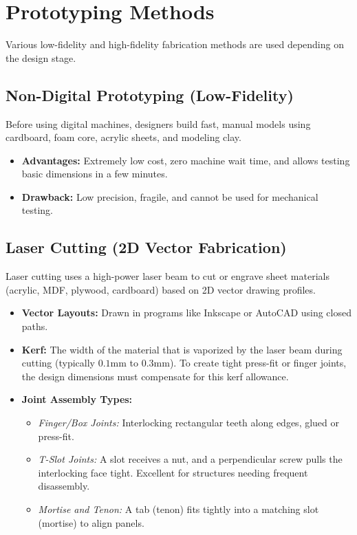 \documentclass[12pt,a4paper]{article}
\begin{document}
\section{Prototyping Methods}

Various low-fidelity and high-fidelity fabrication methods are used depending on the design stage.

\subsection{Non-Digital Prototyping (Low-Fidelity)}
Before using digital machines, designers build fast, manual models using cardboard, foam core, acrylic sheets, and modeling clay.
\begin{itemize}[leftmargin=*, itemsep=2.5pt]
  \item \textbf{Advantages:} Extremely low cost, zero machine wait time, and allows testing basic dimensions in a few minutes.
  \item \textbf{Drawback:} Low precision, fragile, and cannot be used for mechanical testing.
\end{itemize}

\subsection{Laser Cutting (2D Vector Fabrication)}
Laser cutting uses a high-power laser beam to cut or engrave sheet materials (acrylic, MDF, plywood, cardboard) based on 2D vector drawing profiles.
\begin{itemize}[leftmargin=*, itemsep=3.5pt]
  \item \textbf{Vector Layouts:} Drawn in programs like Inkscape or AutoCAD using closed paths.
  \item \textbf{Kerf:} The width of the material that is vaporized by the laser beam during cutting (typically $0.1\text{mm}$ to $0.3\text{mm}$). To create tight press-fit or finger joints, the design dimensions must compensate for this kerf allowance.
  \item \textbf{Joint Assembly Types:}
        \begin{itemize}[leftmargin=*, label=$\circ$, itemsep=1.0pt]
          \item \textit{Finger/Box Joints:} Interlocking rectangular teeth along edges, glued or press-fit.
          \item \textit{T-Slot Joints:} A slot receives a nut, and a perpendicular screw pulls the interlocking face tight. Excellent for structures needing frequent disassembly.
          \item \textit{Mortise and Tenon:} A tab (tenon) fits tightly into a matching slot (mortise) to align panels.
        \end{itemize}
\end{itemize}
\end{document}
